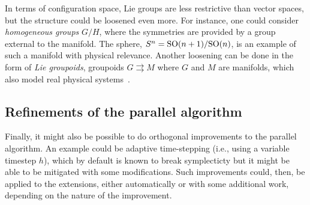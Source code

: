 In terms of configuration space, Lie groups are less restrictive than vector spaces, but the structure could be loosened even more. For instance, one could consider \emph{homogeneous groups} $G/H$, where the symmetries are provided by a group external to the manifold. The sphere, $S^n = \mathrm{SO}(n+1)/\mathrm{SO}(n)$, is an example of such a manifold with physical relevance. Another loosening can be done in the form of \emph{Lie groupoids}, groupoids $G \rightrightarrows M$ where $G$ and $M$ are manifolds, which also model real physical systems~\cite{weinsteinGroupoidsUnifyingInternal1996}.

\subsection*{Refinements of the parallel algorithm}

Finally, it might also be possible to do orthogonal improvements to the parallel algorithm. An example could be adaptive time-stepping (i.e., using a variable timestep $h$), which by default is known to break symplecticty but it might be able to be mitigated with some modifications. Such improvements could, then, be applied to the extensions, either automatically or with some additional work, depending on the nature of the improvement.

